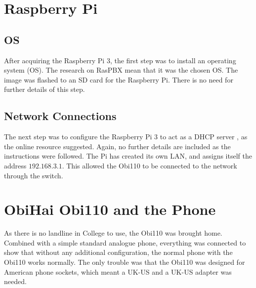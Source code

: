 \documentclass[main.tex]{subfiles}
\begin{document}

\section{Raspberry Pi}
\subsection{OS}
After acquiring the Raspberry Pi 3, the first step was to install an operating system (OS). The research on RasPBX \cite{raspbx} mean that it was the chosen OS. The image was flashed to an SD card for the Raspberry Pi. There is no need for further details of this step.

\subsection{Network Connections}
The next step was to configure the Raspberry Pi 3 to act as a DHCP server \cite{pi-dhcp}, as the online resource suggested. Again, no further details are included as the instructions were followed. The Pi has created its own LAN, and assigns itself the address $192.168.3.1$. This allowed the Obi110 to be connected to the network through the switch.

\section{ObiHai Obi110 and the Phone}
As there is no landline in College to use, the Obi110 was brought home. Combined with a simple standard analogue phone, everything was connected to show that without any additional configuration, the normal phone with the Obi110 works normally. The only trouble was that the Obi110 was designed for American phone sockets, which meant a UK-US and a UK-US adapter was needed.
\end{document}
